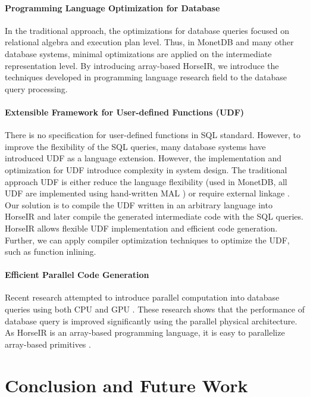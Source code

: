 \documentclass[sigplan]{acmart}
\begin{document}
\paragraph{Programming Language Optimization for Database}
In the traditional approach, the optimizations for database queries focused
on relational algebra and execution plan level. Thus, in MonetDB and many other
database systems, minimal optimizations are applied on the intermediate
representation level. By introducing array-based HorseIR, we introduce the
techniques developed in programming language research field to the database
query processing.

\paragraph{Extensible Framework for User-defined Functions (UDF)}
There is no specification for user-defined functions in SQL standard. However,
to improve the flexibility of the SQL queries, many database systems have
introduced UDF as a language extension. However, the implementation and
optimization for UDF introduce complexity in system design. The traditional
approach UDF is either reduce the language flexibility (used in MonetDB, all
UDF are implemented using hand-written MAL \cite{MALUDF}) or require external
linkage \cite{ExternUDF}. Our solution is to compile the UDF written in an
arbitrary language into HorseIR and later compile the generated intermediate
code with the SQL queries. HorseIR allows flexible UDF implementation and
efficient code generation. Further, we can apply compiler optimization techniques to optimize
the UDF, such as function inlining.

\paragraph{Efficient Parallel Code Generation}
Recent research attempted to introduce parallel computation into database
queries using both CPU\cite{DBLP:conf/sigmod/PolychroniouRR15, DBLP:conf/sigmod/ZhouR02} and GPU \cite{DBLP:conf/ica3pp/CremerBMM16}.
These research shows that the performance of database query is improved
significantly using the parallel physical architecture. As HorseIR is an
array-based programming language, it is easy to parallelize array-based primitives
\cite{DBLP:conf/pldi/ImamSLK14}.

\section{Conclusion and Future Work}
\end{document}
